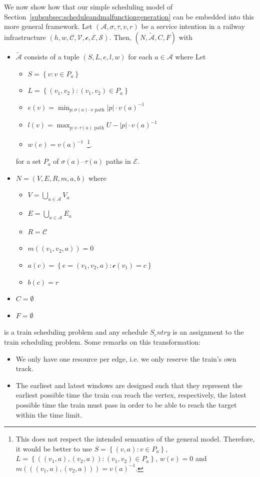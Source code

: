 \documentclass{article}
\begin{document}
We now show how that our simple scheduling model of Section~\ref{subsubsec:scheduleandmalfunctiongeneration} can be embedded into this more general framework. Let $(\mathcal{A},\sigma,\tau,v,r)$ be a service intention in a railway infrastructure $(h,w,\mathcal{C}, \mathcal{V}, \mathscr{c}, \mathcal{E}, \mathcal{S})$.
Then, $(N,\tilde{\mathcal{A}},C,F)$ with
\begin{itemize}
    \item $\tilde{\mathcal{A}}$ consists of a tuple $(S,L,e,l,w)$ for each $a \in \mathcal{A}$ where Let
        \begin{itemize}
            \item $S=\left\{ v: v \in P_a\right\}$
            \item $L=\left\{ (v_1,v_2): (v_1,v_2) \in P_a\right\}$
            \item $e(v)=\min_{p: \sigma(a)\textrm{--}v\textrm{ path}} \left|p\right| \cdot {v(a)}^{-1}$
            \item $l(v)=\max_{p: v\textrm{--}\tau(a)\textrm{ path}} U-\left|p\right| \cdot {v(a)}^{-1}$
            \item $w(e)={v(a)}^{-1}$\mbox{  }\footnote{This does not respect the intended semantics of the general model. Therefore, it would be better to use $S=\left\{ (v,a): v \in P_a\right\}$, $L=\left\{ ((v_1,a),(v_2,a)): (v_1,v_2) \in P_a\right\}$, $w(e)=0$ and $m(((v_1,a),(v_2,a)))={v(a)}^{-1}$.}.
        \end{itemize}
        for a set $P_a$ of $\sigma(a)$--$\tau(a)$ paths in $\mathcal{E}$.
        \item $N=(V,E,R,m,a,b)$ where
        \begin{itemize}
            \item $V=\bigcup_{a \in \mathcal{A}} V_a$
            \item $E=\bigcup_{a \in \mathcal{A}} E_a$
            \item $R=\mathcal{C}$
            \item $m((v_1,v_2,a))=0$
            \item $a(c) = \left\{ e=(v_1,v_2,a): \mathscr{c}(v_1)=c \right\}$
            \item $b(c)=r$
        \end{itemize}
    \item $C=\emptyset$
    \item $F=\emptyset$
\end{itemize}
is a train scheduling problem and any schedule $S_entry$ is an assignment to the train scheduling problem.
Some remarks on this transformation:
\begin{itemize}
    \item We only have one resource per edge, i.e. we only reserve the train's own track.
    \item The earliest and latest windows are designed such that they represent the earliest possible time the train can reach the vertex, respectively, the latest possible time the train must pass in order to be able to reach the target within the time limit.
\end{itemize}
\end{document}
